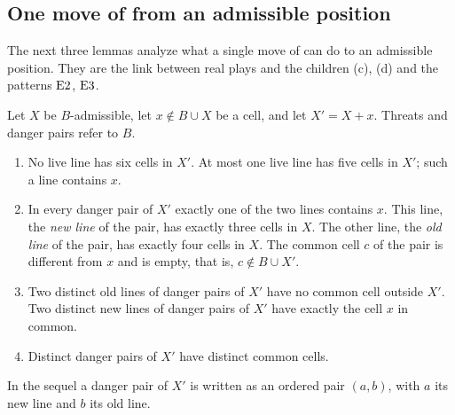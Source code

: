 \subsection{One move of \texorpdfstring{\Maker}{Maker} from an admissible position}\label{sec:one-move}

The next three lemmas analyze what a single move of \Maker{} can do to an admissible position. They are the
link between real plays and the children \textup{(c)}, \textup{(d)} and the patterns $\mathrm{E2}$, $\mathrm{E3}$.

\begin{lemma}\label{lem:one-move}
Let $X$ be $B$-admissible, let $x\notin B\cup X$ be a cell, and let $X'=X+x$. Threats and danger pairs refer
to $B$.
\begin{enumerate}[label=\textup{(\alph*)},leftmargin=2.4em]
\item No live line has six cells in $X'$. At most one live line has five cells in $X'$; such a line contains
  $x$.
\item In every danger pair of $X'$ exactly one of the two lines contains $x$. This line, the \emph{new line}
  of the pair, has exactly three cells in $X$. The other line, the \emph{old line} of the pair, has exactly
  four cells in $X$. The common cell $c$ of the pair is different from $x$ and is empty, that is,
  $c\notin B\cup X'$.
\item Two distinct old lines of danger pairs of $X'$ have no common cell outside $X'$. Two distinct new
  lines of danger pairs of $X'$ have exactly the cell $x$ in common.
\item Distinct danger pairs of $X'$ have distinct common cells.
\end{enumerate}
\end{lemma}

\noindent In the sequel a danger pair of $X'$ is written as an ordered pair $(a,b)$, with $a$ its new line and
$b$ its old line.


